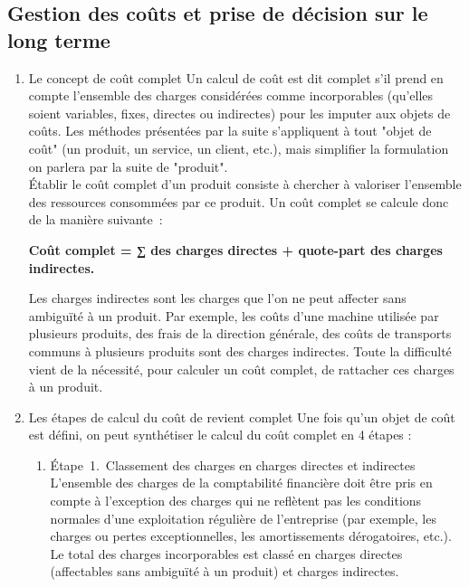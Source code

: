 \documentclass{tufte-handout}
\begin{document}
\subsection{Gestion des coûts et prise de décision sur le long terme}
\label{sec:orge0b0258}
\begin{enumerate}
\item Le concept de coût complet
\label{sec:org4d5383b}
Un calcul de coût est dit complet s'il prend en compte l'ensemble des charges considérées comme incorporables (qu'elles soient variables, fixes, directes ou indirectes) pour les imputer aux objets de coûts. Les méthodes présentées par la suite s'appliquent à tout "objet de coût" (un produit, un service, un client, etc.), mais simplifier la formulation on parlera par la suite de "produit".\\
Établir le coût complet d'un produit consiste à chercher à valoriser l'ensemble des ressources consommées par ce produit. Un coût complet se calcule donc de la manière suivante :\\
\begin{center}
\textbf{Coût complet = ∑ des charges directes + quote-part des charges indirectes.}\\
\end{center}
Les charges indirectes sont les charges que l'on ne peut affecter sans ambiguïté à un produit. Par exemple, les coûts d'une machine utilisée par plusieurs produits, des frais de la direction générale, des coûts de transports communs à plusieurs produits sont des charges indirectes. Toute la difficulté vient de la nécessité, pour calculer un coût complet, de rattacher ces charges à un produit.\\
\item Les étapes de calcul du coût de revient complet
\label{sec:org99f23c6}
Une fois qu'un objet de coût est défini, on peut synthétiser le calcul du coût complet en 4 étapes :\\
\begin{enumerate}
\item Étape 1. Classement des charges en charges directes et indirectes
\label{sec:orgf7e2364}
L'ensemble des charges de la comptabilité financière doit être pris en compte à l'exception des charges qui ne reflètent pas les conditions normales d'une exploitation régulière de l'entreprise (par exemple, les charges ou pertes exceptionnelles, les amortissements dérogatoires, etc.). Le total des charges incorporables est classé en charges directes (affectables sans ambiguïté à un produit) et charges indirectes.\\

\end{enumerate}
\end{enumerate}
\end{document}
